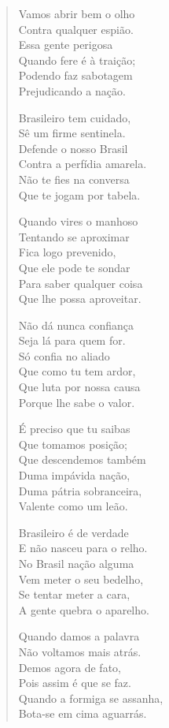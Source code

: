 \begin{verse}
Vamos abrir bem o olho\\
Contra qualquer espião.\\
Essa gente perigosa\\
Quando fere é à traição;\\
Podendo faz sabotagem\\
Prejudicando a nação.
\pagebreak

Brasileiro tem cuidado,\\
Sê um firme sentinela.\\
Defende o nosso Brasil\\
Contra a perfídia amarela.\\
Não te fies na conversa\\
Que te jogam por tabela.

Quando vires o manhoso\\
Tentando se aproximar\\
Fica logo prevenido,\\
Que ele pode te sondar\\
Para saber qualquer coisa\\
Que lhe possa aproveitar.

Não dá nunca confiança\\
Seja lá para quem for.\\
Só confia no aliado\\
Que como tu tem ardor,\\
Que luta por nossa causa\\
Porque lhe sabe o valor.

É preciso que tu saibas\\
Que tomamos posição;\\
Que descendemos também\\
Duma impávida nação,\\
Duma pátria sobranceira,\\
Valente como um leão.
\pagebreak

Brasileiro é de verdade\\
E não nasceu para o relho.\\
No Brasil nação alguma\\
Vem meter o seu bedelho,\\
Se tentar meter a cara,\\
A gente quebra o aparelho.

Quando damos a palavra\\
Não voltamos mais atrás.\\
Demos agora de fato,\\
Pois assim é que se faz.\\
Quando a formiga se assanha,\\
Bota-se em cima aguarrás.


\end{verse}
